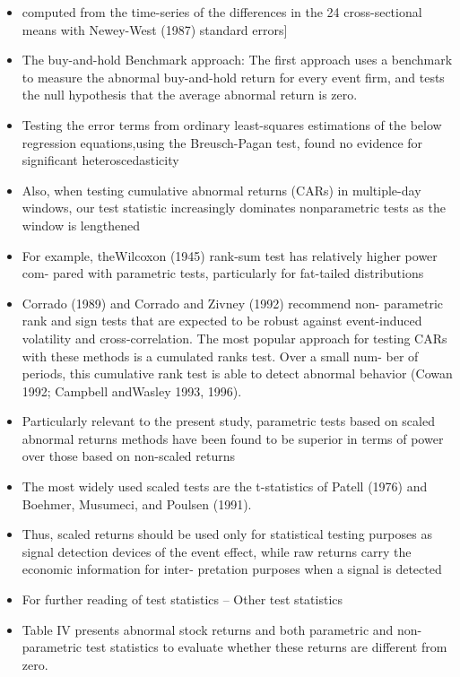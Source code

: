 \documentclass[12pt]{article}
\begin{document}
    \begin{itemize}

        \item computed from the time-series of the differences in the 24 cross-sectional means with Newey-West (1987) standard errors] \citep{Choi2012}

        \item The buy-and-hold Benchmark approach: The first approach uses a benchmark to measure the abnormal buy-and-hold return for every event firm, and tests the null hypothesis that the average abnormal return is zero.\citep{ang2011}

        \item Testing the error terms from ordinary least-squares estimations of the below regression equations,using the Breusch-Pagan test, found no evidence for significant heteroscedasticity \citep{Brigida2012}

        \item Also, when testing cumulative abnormal returns (CARs) in multiple-day windows, our test statistic increasingly dominates nonparametric tests as the window is lengthened \citep{Kolari2010}

        \item For example, theWilcoxon (1945) rank-sum test has relatively higher power com- pared with parametric tests, particularly for fat-tailed distributions \citep{Kolari2010}

        \item Corrado (1989) and Corrado and Zivney (1992) recommend non- parametric rank and sign tests that are expected to be robust against event-induced volatility and cross-correlation. The most popular approach for testing CARs with these methods is a cumulated ranks test. Over a small num- ber of periods, this cumulative rank test is able to detect abnormal behavior (Cowan 1992; Campbell andWasley 1993, 1996).\citep{Kolari2010}

        \item Particularly relevant to the present study, parametric tests based on scaled abnormal returns methods have been found to be superior in terms of power over those based on non-scaled returns \citep{Kolari2010}

        \item The most widely used scaled tests are the t-statistics of Patell (1976) and Boehmer, Musumeci, and Poulsen (1991). \citep{Kolari2010}

        \item Thus, scaled returns should be used only for statistical testing purposes as signal detection devices of the event effect, while raw returns carry the economic information for inter- pretation purposes when a signal is detected \citep{Kolari2010}

        \item For further reading of test statistics -- Other test statistics \citep{Kolari2010}

        \item Table IV presents abnormal stock returns and both parametric and non- parametric test statistics to evaluate whether these returns are different from zero. \citep{Klein2009}
    \end{itemize}
\end{document}
